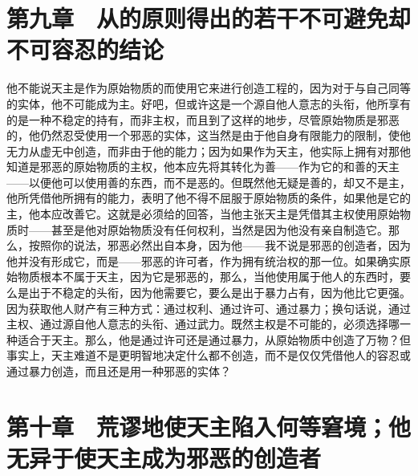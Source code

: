 
\section{第九章　从的原则得出的若干不可避免却不可容忍的结论}

他不能说天主是作为原始物质的而使用它来进行创造工程的，因为对于与自己同等的实体，他不可能成为主。好吧，但或许这是一个源自他人意志的头衔，他所享有的是一种不稳定的持有，而非主权，而且到了这样的地步，尽管原始物质是邪恶的，他仍然忍受使用一个邪恶的实体，这当然是由于他自身有限能力的限制，使他无力从虚无中创造，而非由于他的能力；因为如果作为天主，他实际上拥有对那他知道是邪恶的原始物质的主权，他本应先将其转化为善——作为它的和善的天主——以便他可以使用善的东西，而不是恶的。但既然他无疑是善的，却又不是主，他所凭借他所拥有的能力，表明了他不得不屈服于原始物质的条件，如果他是它的主，他本应改善它。这就是必须给的回答，当他主张天主是凭借其主权使用原始物质时——甚至是他对原始物质没有任何权利，当然是因为他没有亲自制造它。那么，按照你的说法，邪恶必然出自本身，因为他——我不说是邪恶的创造者，因为他并没有形成它，而是——邪恶的许可者，作为拥有统治权的那一位。如果确实原始物质根本不属于天主，因为它是邪恶的，那么，当他使用属于他人的东西时，要么是出于不稳定的头衔，因为他需要它，要么是出于暴力占有，因为他比它更强。因为获取他人财产有三种方式：通过权利、通过许可、通过暴力；换句话说，通过主权、通过源自他人意志的头衔、通过武力。既然主权是不可能的，必须选择哪一种适合于天主。那么，他是通过许可还是通过暴力，从原始物质中创造了万物？但事实上，天主难道不是更明智地决定什么都不创造，而不是仅仅凭借他人的容忍或通过暴力创造，而且还是用一种邪恶的实体？\par


\section{第十章　荒谬地使天主陷入何等窘境；他无异于使天主成为邪恶的创造者}

